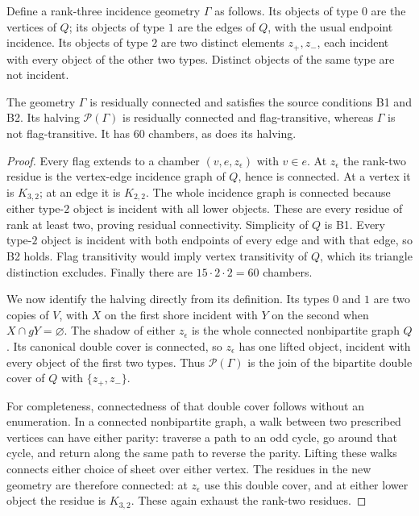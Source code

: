 Define a rank-three incidence geometry $\Gamma$ as follows. Its
objects of type $0$ are the vertices of $Q$; its objects of type $1$
are the edges of $Q$, with the usual endpoint incidence. Its objects
of type $2$ are two distinct elements $z_+,z_-$, each incident with
every object of the other two types. Distinct objects of the same
type are not incident.

\begin{proposition}\label{NT.example}
The geometry $\Gamma$ is residually connected and satisfies the
source conditions B1 and B2. Its halving $\mathcal P(\Gamma)$ is
residually connected and flag-transitive, whereas $\Gamma$ is not
flag-transitive. It has $60$ chambers, as does its halving.
\end{proposition}
\begin{proof}
Every flag extends to a chamber $(v,e,z_\epsilon)$ with $v\in e$.
At $z_\epsilon$ the rank-two residue is the vertex-edge incidence
graph of $Q$, hence is connected. At a vertex it is $K_{3,2}$;
at an edge it is $K_{2,2}$. The whole incidence graph is connected
because either type-$2$ object is incident with all lower objects.
These are every residue of rank at least two, proving residual
connectivity. Simplicity of $Q$ is B1. Every type-$2$ object is
incident with both endpoints of every edge and with that edge, so
B2 holds. Flag transitivity would imply vertex transitivity of $Q$,
which its triangle distinction excludes. Finally there are
$15\cdot2\cdot2=60$ chambers.

We now identify the halving directly from its definition. Its types
$0$ and $1$ are two copies of $V$, with $X$ on the first shore
incident with $Y$ on the second when $X\cap gY=\varnothing$.
The shadow of either $z_\epsilon$ is the whole connected
nonbipartite graph $Q$. Its canonical double cover is connected,
so $z_\epsilon$ has one lifted object, incident with every object
of the first two types. Thus $\mathcal P(\Gamma)$ is the join of
the bipartite double cover of $Q$ with $\{z_+,z_-\}$.

For completeness, connectedness of that double cover follows without
an enumeration. In a connected nonbipartite graph, a walk between
two prescribed vertices can have either parity: traverse a path to
an odd cycle, go around that cycle, and return along the same path
to reverse the parity. Lifting these walks connects either choice
of sheet over either vertex. The residues in the new geometry are
therefore connected: at $z_\epsilon$ use this double cover, and at
either lower object the residue is $K_{3,2}$. These again exhaust
the rank-two residues.


\end{proof}
